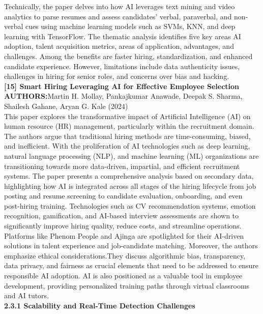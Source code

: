 \documentclass[a4paper, 12pt]{report}
\begin{document}
Technically, the paper delves into how AI leverages text mining and video analytics to parse resumes and assess candidates’ verbal, paraverbal, and non-verbal cues using machine learning models such as SVMs, KNN, and deep learning with TensorFlow. The thematic analysis identifies five key areas AI adoption, talent acquisition metrics, areas of application, advantages, and challenges. Among the benefits are faster hiring, standardization, and enhanced candidate experience. However, limitations include data authenticity issues, challenges in hiring for senior roles, and concerns over bias and hacking.\\
\noindent\textbf{[15] Smart Hiring Leveraging AI for Effective Employee Selection}\\
\textbf{AUTHORS:}Martin H. Mollay, Pankajkumar Anawade, Deepak S. Sharma, Shailesh Gahane, Aryan G. Kale (2024)\\
This paper explores the transformative impact of Artificial Intelligence (AI) on human resource (HR) management, particularly within the recruitment domain. The authors argue that traditional hiring methods are time-consuming, biased, and inefficient. With the proliferation of AI technologies such as deep learning, natural language processing (NLP), and machine learning (ML) organizations are transitioning towards more data-driven, impartial, and efficient recruitment systems.
The paper presents a comprehensive analysis based on secondary data, highlighting how AI is integrated across all stages of the hiring lifecycle from job posting and resume screening to candidate evaluation, onboarding, and even post-hiring training. Technologies such as CV recommendation systems, emotion recognition, gamification, and AI-based interview assessments are shown to significantly improve hiring quality, reduce costs, and streamline operations. Platforms like Phenom People and Ajinga are spotlighted for their AI-driven solutions in talent experience and job-candidate matching.
Moreover, the authors emphasize ethical considerations.They discuss algorithmic bias, transparency, data privacy, and fairness as crucial elements that need to be addressed to ensure responsible AI adoption. AI is also positioned as a valuable tool in employee development, providing personalized training paths through virtual classrooms and AI tutors.\\
\textbf{2.3.1 Scalability and Real-Time Detection Challenges}
\end{document}
